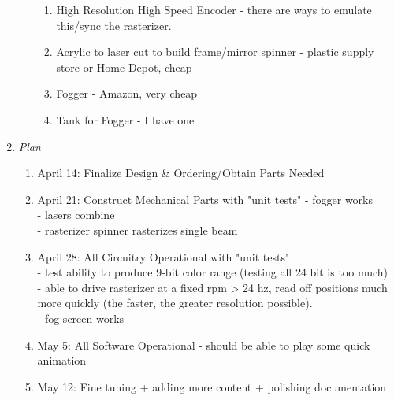 \documentclass[12pt]{article}
\begin{document}
\begin{enumerate}
\begin{enumerate}
\begin{enumerate}
\item High Resolution High Speed Encoder - there are ways to emulate this/sync the rasterizer.
\item Acrylic to laser cut to build frame/mirror spinner 
- plastic supply store or Home Depot, cheap
\item Fogger - Amazon, very cheap
\item Tank for Fogger - I have one
\end{enumerate}
\end{enumerate}
\item
\emph{Plan}
\begin{enumerate}
\item
April 14: Finalize Design \& Ordering/Obtain Parts Needed
\item
April 21: Construct Mechanical Parts with "unit tests"
- fogger works\\
- lasers combine\\
- rasterizer spinner rasterizes single beam
\item
April 28: All Circuitry Operational with "unit tests"\\
- test ability to produce 9-bit color range (testing all 24 bit is too much)\\
- able to drive rasterizer at a fixed rpm > 24 hz, read off positions much more quickly
(the faster, the greater resolution possible).\\
- fog screen works
\item
May 5: All Software Operational
- should be able to play some quick animation
\item
May 12: Fine tuning + adding more content + polishing documentation
\end{enumerate}
\end{enumerate}
\end{document}
